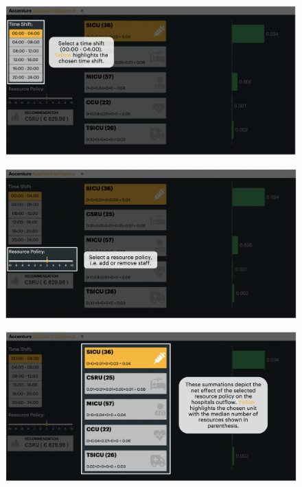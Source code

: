 \documentclass[12pt]{article}
\begin{document}
\begin{figure}[h!]
	\centering
	\includegraphics[scale=0.3]{../outflow-app/screenshots/detail_1.png}
	\label{detail_1}
\end{figure}
\begin{figure}[h!]
	\centering
	\includegraphics[scale=0.3]{../outflow-app/screenshots/detail_2.png}
	\label{detail_2}
\end{figure}
\begin{figure}[h!]
	\centering
	\includegraphics[scale=0.3]{../outflow-app/screenshots/detail_3.png}
	\label{detail_3}
\end{figure}
\end{document}
